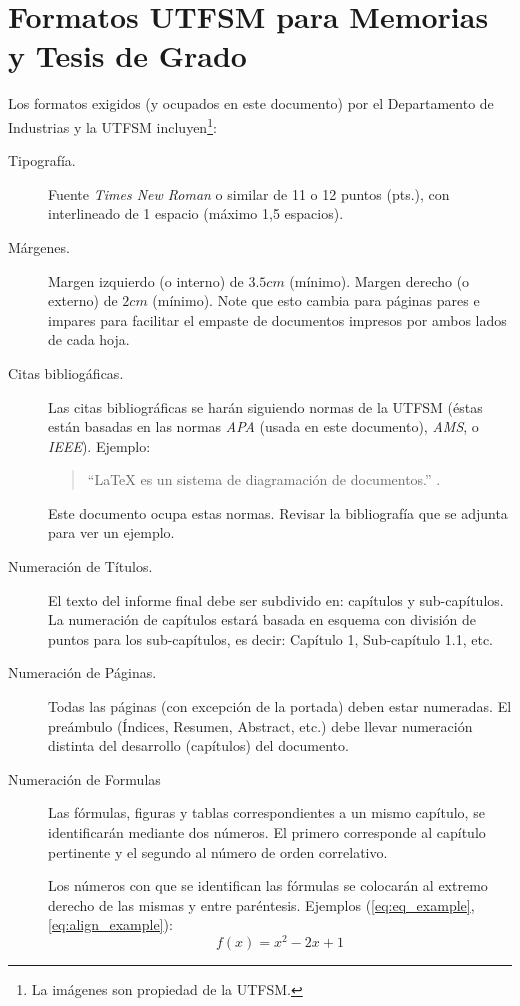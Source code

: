 
\chapter{Formatos UTFSM para Memorias y Tesis de Grado }

Los formatos exigidos (y ocupados en este documento) por el Departamento de Industrias y la UTFSM incluyen\footnote{La imágenes son propiedad de la UTFSM.}:

\begin{description}
\item[Tipografía.] Fuente \emph{Times New Roman} o similar de 11 o 12 puntos (pts.), con interlineado de 1 espacio (máximo 1,5 espacios).
\item[Márgenes.] Margen izquierdo (o interno) de $3.5cm$ (mínimo). Margen derecho (o externo) de $2cm$ (mínimo). Note que esto cambia para páginas pares e impares para facilitar el empaste de documentos impresos por ambos lados de cada hoja.
\item[Citas bibliogáficas.] Las citas bibliográficas se harán siguiendo normas de la UTFSM (éstas están basadas en las normas \emph{APA} (usada en este documento), \emph{AMS}, o \emph{IEEE}). Ejemplo:

\begin{quote}
    ``\LaTeX{} es un sistema de diagramación de documentos.'' \citep{Lamport94}.
\end{quote}

Este documento ocupa estas normas. Revisar la bibliografía que se adjunta para ver un ejemplo.

\item[Numeración de Títulos.] El texto del informe final debe ser subdivido en: capítulos y sub-capítulos. La numeración de capítulos estará basada en esquema con división de puntos para los sub-capítulos, es decir: Capítulo 1, Sub-capítulo 1.1, etc.
\item[Numeración de Páginas.] Todas las páginas (con excepción de la portada) deben estar numeradas. El preámbulo (Índices, Resumen, Abstract, etc.) debe llevar numeración distinta del desarrollo (capítulos) del documento.
\item[Numeración de Formulas] Las fórmulas, figuras y tablas correspondientes a un mismo capítulo, se identificarán mediante dos números. El primero corresponde al capítulo pertinente y el segundo al número de orden correlativo.
    
    Los números con que se identifican las fórmulas se colocarán al extremo derecho de las mismas y entre paréntesis. Ejemplos (\autoref{eq:eq_example}, \autoref{eq:align_example}):
    \begin{equation}
    f(x) = x^2-2x+1
    \label{eq:eq_example}
    \end{equation}


\end{description}
